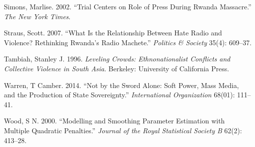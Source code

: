 \documentclass[11pt,article,oneside]{memoir}
\begin{document}
Simons, Marlise. 2002. ``Trial Centers on Role of Press During Rwanda
Massacre.'' \emph{The New York Times}.

Straus, Scott. 2007. ``What Is the Relationship Between Hate Radio and
Violence? Rethinking Rwanda's Radio Machete.'' \emph{Politics \&
Society} 35(4): 609--37.

Tambiah, Stanley J. 1996. \emph{Leveling Crowds: Ethnonationalist
Conflicts and Collective Violence in South Asia}. Berkeley: University
of California Press.

Warren, T Camber. 2014. ``Not by the Sword Alone: Soft Power, Mass
Media, and the Production of State Sovereignty.'' \emph{International
Organization} 68(01): 111--41.

Wood, S N. 2000. ``Modelling and Smoothing Parameter Estimation with
Multiple Quadratic Penalties.'' \emph{Journal of the Royal Statistical
Society B} 62(2): 413--28.
\end{document}
